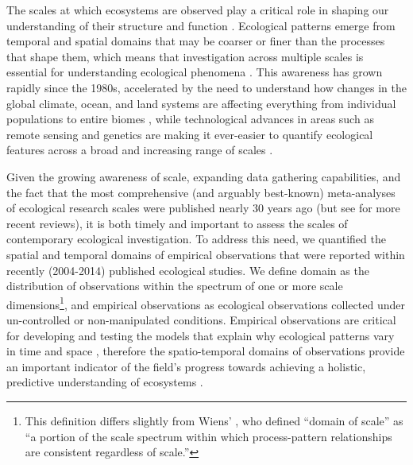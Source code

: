 \documentclass[12pt]{article}
\begin{document}
\linenumbers
\vspace{10pt}
The scales at which ecosystems are observed play a critical role in shaping our understanding of their structure and function \cite{levin_problem_1992,chave_problem_2013,wiens_spatial_1989}.  Ecological patterns emerge from temporal and spatial domains that may be coarser or finer than the processes that shape them, which means that investigation across multiple scales is essential for understanding ecological phenomena \cite{levin_problem_1992,sandel_scale_2009}. This awareness has grown rapidly since the 1980s, accelerated by the need to understand how changes in the global climate, ocean, and land systems are affecting everything from individual populations \cite{tingley_push_2012} to entire biomes \cite{xiao_photosynthetic_2004}, while technological advances in areas such as remote sensing and genetics are making it ever-easier to quantify ecological features across a broad and increasing range of scales \cite{schneider_rise_2001, chave_problem_2013}.  

Given the growing awareness of scale, expanding data gathering capabilities, and the fact that the most comprehensive (and arguably best-known) meta-analyses \cite{tilman_ecological_1989,kareiva_spatial_1988} of ecological research scales were published nearly 30 years ago (but see \cite{porter_crop_2005,sandel_scale_2009} for more recent reviews), it is both timely and important to assess the scales of contemporary ecological investigation. To address this need, we quantified the spatial and temporal domains of empirical observations that were reported within recently (2004-2014) published ecological studies. We define domain as the distribution of observations within the spectrum of one or more scale dimensions\footnote{This definition differs slightly from Wiens' \cite{wiens_spatial_1989}, who defined ``domain of scale'' as ``a portion of the scale spectrum within which process-pattern relationships are consistent regardless of scale.''}, and empirical observations as ecological observations collected under un-controlled or non-manipulated conditions. Empirical observations are critical for developing and testing the models that explain why ecological patterns vary in time and space \cite{levin_problem_1992, tilman_ecological_1989}, therefore the spatio-temporal domains of observations provide an important indicator of the field's progress towards achieving a holistic, predictive understanding of ecosystems \cite{chave_problem_2013,levin_problem_1992}. 
\end{document}

